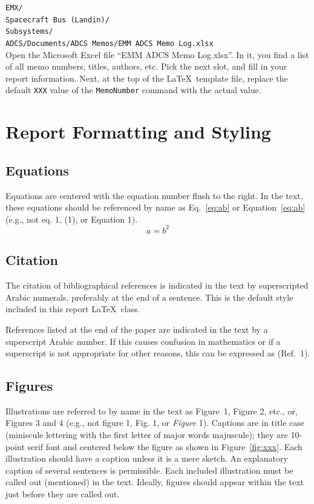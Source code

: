 \documentclass[]{LASPReportMemo}
\begin{document}
\noindent
{\tt EMX/\\
 Spacecraft Bus (Landin)/\\
\indent\indent Subsystems/\\
\indent\indent\indent ADCS/Documents/ADCS Memos/EMM ADCS Memo Log.xlsx}
\\

\noindent Open the Microsoft Excel file ``EMM ADCS Memo Log.xlsx''.  In it, you find a list of all memo numbers, titles, authors, etc.  Pick the next slot, and fill in your report information.  Next, at the top of the \LaTeX\ template file, replace the default {\tt XXX} value of the {\tt MemoNumber} command with the actual value.  



\section{Report Formatting and Styling}
\subsection{Equations}
Equations are centered with the equation number flush to the right. In the text, these equations should be referenced by name as Eq.~\eqref{eq:ab} or Equation~\eqref{eq:ab} (e.g., not eq.  1, (1), or Equation 1).
\begin{equation}
	\label{eq:ab}
	a = b^{2}
\end{equation}


\subsection{Citation}
The citation of bibliographical references is indicated in the text by superscripted Arabic numerals, preferably at the end of a sentence.  This is the default style included in this report \LaTeX\ class.

References listed at the end of the paper are indicated in the text by a superscript Arabic number. If this causes confusion in mathematics or if a superscript is not appropriate for other reasons, this can be expressed as (Ref.~1).  

\subsection{Figures}
Illustrations are referred to by name in the text as Figure~1, Figure 2, etc., or, Figures 3 and 4 (e.g., not figure 1, Fig. 1, or \emph{Figure} 1). Captions are in title case (miniscule lettering with the first letter of major words majuscule); they are 10-point serif font and centered below the figure as shown in Figure~\ref{fig:xxx}. Each illustration should have a caption unless it is a mere sketch. An explanatory caption of several sentences is permissible. Each included illustration must be called out (mentioned) in the text. Ideally, figures should appear within the text just before they are called out. 
\end{document}
